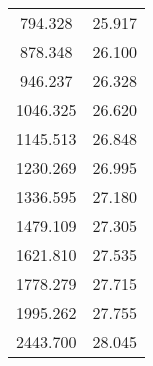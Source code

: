 \begin{table}
\begin{tabular}{cc}
794.328 & 25.917 \\
878.348 & 26.100 \\
946.237 & 26.328 \\
1046.325 & 26.620 \\
1145.513 & 26.848 \\
1230.269 & 26.995 \\
1336.595 & 27.180 \\
1479.109 & 27.305 \\
1621.810 & 27.535 \\
1778.279 & 27.715 \\
1995.262 & 27.755 \\
2443.700 & 28.045 \\
\end{tabular}
\end{table}
